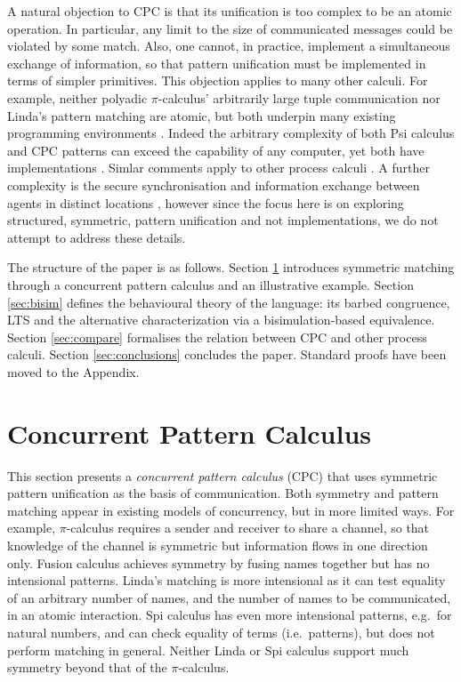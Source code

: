 \documentclass{LMCS}
\begin{document}
A natural objection to CPC is that its unification is too complex to
be an atomic operation. In particular, any limit to the size of
communicated messages could be violated by some match. Also, one
cannot, in practice, implement a simultaneous exchange of information,
so that pattern unification must be implemented in terms of simpler
primitives.
This objection applies to many other calculi.
For example, neither polyadic $\pi$-calculus' arbitrarily large tuple communication
nor Linda's pattern matching are atomic, but both underpin many existing programming environments
\cite{Pierce97pict:a,cpplinda,Klava,Lime}.
Indeed the arbitrary complexity of both Psi calculus and CPC patterns can
exceed the capability of any computer, yet both have implementations
\cite{Khorsandiaghai603139,cbondi}.
Simlar comments apply to other process calculi
\cite{20110201:jocaml,nomadic-pict}.
A further complexity is the secure synchronisation and information exchange between agents
in distinct locations \cite{DY83,Fournet07atype,bengtson2011refinement},
however since the focus here is on exploring structured, symmetric, pattern unification
and not implementations, we do not attempt to address these details.

The structure of the paper is as follows.  Section \ref{sec:cpc}
introduces symmetric matching through a concurrent pattern calculus
and an illustrative example. Section \ref{sec:bisim} defines the
behavioural theory of the language: its barbed congruence, LTS and the
alternative characterization via a bisimulation-based equivalence.  Section \ref{sec:compare} formalises the relation between CPC and
other process calculi.
Section \ref{sec:conclusions} concludes the paper.
Standard proofs have been moved to the Appendix.

\section{Concurrent Pattern Calculus} 
\label{sec:cpc} 
This section presents a {\em concurrent pattern calculus} (CPC) that
uses symmetric pattern unification as the basis of communication. Both
symmetry and pattern matching appear in existing models of
concurrency, but in more limited ways.  For example, $\pi$-calculus
requires a sender and receiver to share a channel, so that knowledge
of the channel is symmetric but information flows in one direction
only.  Fusion calculus achieves symmetry by fusing names together but
has no intensional patterns.  Linda's matching is more intensional as
it can test equality of an arbitrary number of names, and the number
of names to be communicated, in an atomic interaction.  Spi calculus
has even more intensional patterns, e.g.~for natural numbers, and can
check equality of terms (i.e.\ patterns), but does not perform
matching in general.  Neither Linda or Spi calculus support much
symmetry beyond that of the $\pi$-calculus.
\end{document}
